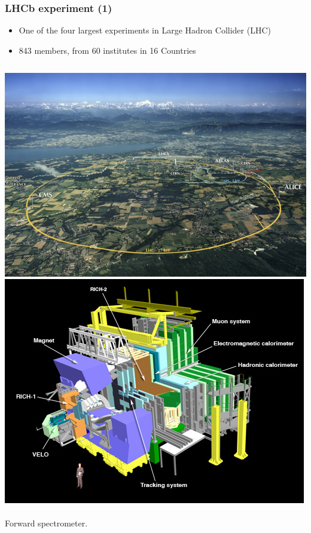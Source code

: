 \documentclass{beamer}
\begin{document}
\begin{frame}[t]
\frametitle{LHCb experiment (1)}
\begin{itemize}
  \item One of the four largest experiments in Large Hadron Collider (LHC)
  \item 843 members, from 60 institutes in 16 Countries
\end{itemize}
\begin{columns}[t]
\includegraphics[width=\textwidth]{images/lhcb.png}
\includegraphics[width=\textwidth]{images/det.png}\\~\\
Forward spectrometer.
\end{columns}

\end{frame}
\end{document}
